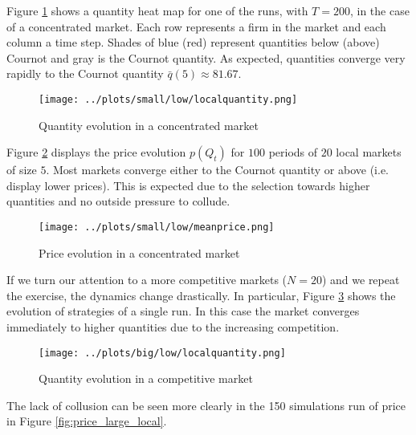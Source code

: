 \documentclass[american]{scrartcl}
\begin{document}
Figure \ref{fig:small_local} shows a quantity heat map for one of the runs, with $T = 200$, in the case of a concentrated market. Each row represents a firm in the market and each column a time step. Shades of blue (red) represent quantities below (above) Cournot and gray is the Cournot quantity. As expected, quantities converge very rapidly to the Cournot quantity $\bar{q}(5) \approx 81.67$.

\begin{center}
    \begin{figure}[H]
        \center
        \texttt{[image: ../plots/small/low/localquantity.png]}
        \caption{Quantity evolution in a concentrated market}
        \label{fig:small_local}
    \end{figure}
\end{center}

Figure \ref{fig:price_small_local} displays the price evolution $p(Q_t)$ for $100$ periods of $20$ local markets of size $5$. Most markets converge either to the Cournot quantity or above (i.e. display lower prices). This is expected due to the selection towards higher quantities and no outside pressure to collude.

\begin{center}
    \begin{figure}[H]
        \center
        \texttt{[image: ../plots/small/low/meanprice.png]}
        \caption{Price evolution in a concentrated market}
        \label{fig:price_small_local}
    \end{figure}
\end{center}

If we turn our attention to a more competitive markets ($N=20$) and we repeat the exercise, the dynamics change drastically. In particular, Figure \ref{fig:large_local} shows the evolution of strategies of a single run. In this case the market converges immediately to higher quantities due to the increasing competition.

\begin{center}
    \begin{figure}[H]
        \center
        \texttt{[image: ../plots/big/low/localquantity.png]}
        \caption{Quantity evolution in a competitive market}
        \label{fig:large_local}
    \end{figure}
\end{center}

The lack of collusion can be seen more clearly in the 150 simulations run of price in Figure \ref{fig:price_large_local}.
\end{document}
